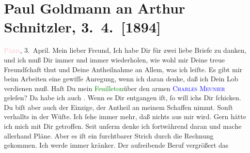 

               \section[Paul Goldmann an Arthur Schnitzler, 3. 4. {[}1894{]}]{ Paul Goldmann an Arthur Schnitzler, 3. 4. {[}1894{]}}\nopagebreak{}\rehead{ }\normalsize\beginnumbering{} \toendnotes[C]{\smallbreak\pagebreak[2]} 
\toendnotes[C]{\smallbreak}\pstart
           \raggedleft{}{\pb}\textsc{\textcolor{pink}{Paris}{}\ledrightnote{\textcolor{pink}{Paris}}}, 3. April.\pend
           \pstart\center{}Mein lieber Freund,\pend\pstart
           Ich habe Dir für zwei liebe Briefe zu danken, und ich muß Dir immer und immer
               wiederholen, wie wohl mir Deine treue Freundſchaft thut und Deine Antheilnahme an
               Allem, was ich leiſte. Es gibt mir beim Arbeiten eine gewiſſe Anregung, wenn ich
               daran denke, daß ich Dein Lob verdienen muß. Haſt Du mein \textcolor{green}{Feuilleton}{}über den armen \textsc{\textcolor{blue}{Charles Meunier}{}\ledrightnote{\textcolor{blue}{Charles Meunier}}} geleſen? Da habe ich auch \label{K_L02615-3v}\label{K_L02615-3h}. Wenn es Dir entgangen iſt,
               ſo will ichs Dir ſchicken.\pend
           \pstart
           Du biſt aber auch der Einzige, der Antheil an meinem Schaffen nimmt. Sonſt verhallts
               in der Wüſte. Ich ſehe immer mehr, daß nichts aus mir wird.\pend
           \pstart
           Gern hätte ich mich mit Dir getroffen. Seit unſerm \label{K_L02615-4v}\label{K_L02615-4h} denke ich fortwährend daran und mache allerhand Pläne. {\pb}Aber es iſt ein furchtbarer Strich durch die
               Rechnung gekommen. Ich werde immer kränker. Der aufreibende Beruf vergrößert das
